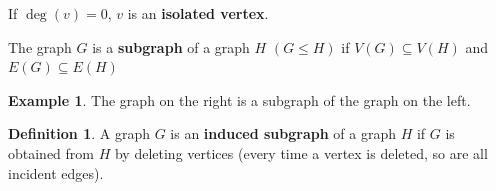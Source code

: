 \documentclass[12pt]{article}
\theoremstyle{definition}
\newtheorem{defn}{Definition}[section]
\newtheorem{ex}{Example}[section]
\begin{document}
\begin{bluebox}
    If $\deg(v) = 0$, $v$ is an \textbf{isolated vertex}.
\end{bluebox}

\begin{bluebox}
    The graph $G$ is a \textbf{subgraph} of a graph $H$ $(G \leq H)$ if $V(G) \subseteq V(H)$ and $E(G) \subseteq E(H)$
\end{bluebox}

\begin{graybox}
    \begin{ex}
    The graph on the right is a subgraph of the graph on the left.
    \center
{}
\hspace{32pt}
    \end{ex}
\end{graybox}

\begin{bluebox}
    \begin{defn}
        A graph $G$ is an \textbf{induced subgraph} of a graph $H$ if $G$ is obtained from $H$ by deleting vertices (every time a vertex is deleted, so are all incident edges).
    \end{defn}
\end{bluebox}
\end{document}
